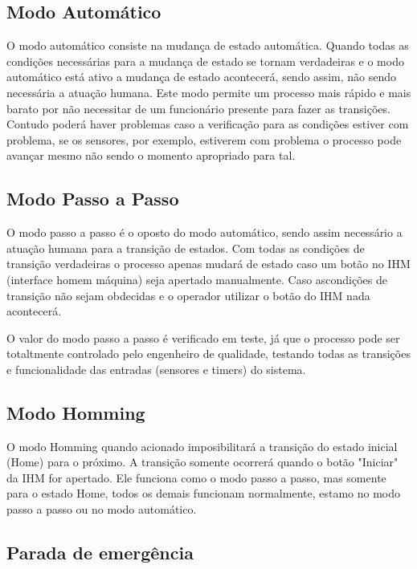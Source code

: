 \documentclass[12pt]{article}
\begin{document}
	\subsection{Modo Automático}
	O modo automático consiste na mudança de estado automática. Quando todas as condições necessárias para a mudança de estado se tornam verdadeiras e o modo automático está ativo a mudança de estado acontecerá, sendo assim, não sendo necessária a atuação humana. Este modo permite um processo mais rápido e mais barato por não necessitar de um funcionário presente para fazer as transições. Contudo poderá haver problemas caso a verificação para as condições estiver com problema, se os sensores, por exemplo, estiverem com problema o processo pode avançar mesmo não sendo o momento apropriado para tal.
	
	\subsection{Modo Passo a Passo}
	
	O modo passo a passo é o oposto do modo automático, sendo assim necessário a atuação humana para a transição de estados. Com todas as condições de transição verdadeiras o processo apenas mudará de estado caso um botão no IHM (interface homem máquina) seja apertado manualmente. Caso ascondições de transição não sejam obdecidas e o operador utilizar o botão do IHM nada acontecerá.
	
	O valor do modo passo a passo é verificado em teste, já que o processo pode ser totaltmente controlado pelo engenheiro de qualidade, testando todas as transições e funcionalidade das entradas (sensores e timers) do sistema.
	
	\subsection{Modo Homming}
	
	O modo Homming quando acionado imposibilitará a transição do estado inicial (Home) para o próximo. A transição somente ocorrerá quando o botão "Iniciar" da IHM for apertado. Ele funciona como o modo passo a passo, mas somente para o estado Home, todos os demais funcionam normalmente, estamo no modo passo a passo ou no modo automático.
	
	\subsection{Parada de emergência}
	
\end{document}
